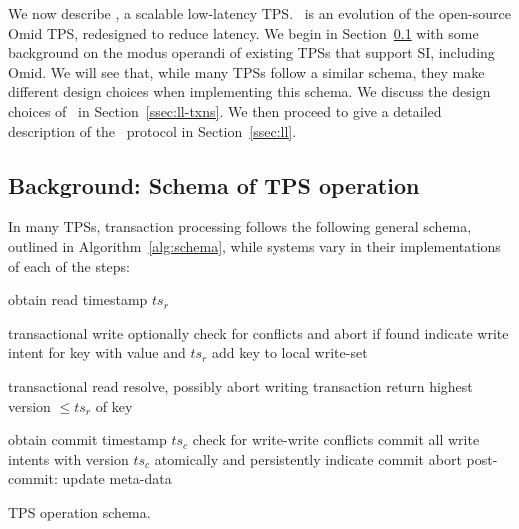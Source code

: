 

We now describe \sys, a scalable low-latency TPS.
\sys\ is an evolution of the open-source Omid TPS, redesigned to reduce latency.
We begin in Section~\ref{ssec:schema} with some background on the modus operandi of existing TPSs that support SI, including Omid. 
We will see that, while many TPSs follow a similar schema,  they make different design choices when implementing this schema. 
We discuss the design choices of \sys\ in Section~\ref{ssec:ll-txns}. 
We then proceed to give a detailed description of the \sys\ protocol
in Section~\ref{ssec:ll}.

\subsection{Background: Schema of TPS operation}
\label{ssec:schema}


In many TPSs, transaction processing follows the following general schema, outlined in Algorithm~\ref{alg:schema}, 
while systems vary in their implementations of each of the steps:


\begin{algorithm}[tb]
\begin{algorithmic}[1]
\State obtain read timestamp $ts_r$ 
\EndProcedure
\Statex

 \Comment transactional write
\State optionally check for conflicts and abort if found 
\State indicate write intent for key with value and $ts_r$
\State add key to local write-set
\EndProcedure
\Statex

 \Comment transactional read
	\State resolve, possibly abort writing transaction \label{l:resolve}
\EndIf
\State return highest version   $\le ts_r$ of key
\EndProcedure

\Statex

\State obtain commit timestamp $ts_c$
\Statex \Comment check for write-write conflicts  \label{l:validate}
	\Statex \Comment commit all write intents with version $ts_c$
	\State atomically and persistently indicate commit   \label{l:commit}
\Else
	\State abort	
\EndIf
\State post-commit: update meta-data
\EndProcedure

\end{algorithmic}
\caption{TPS operation schema.} 
\label{alg:schema}
\end{algorithm} 


